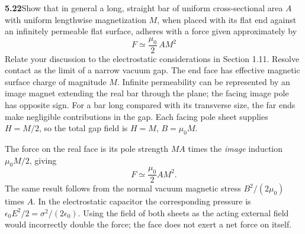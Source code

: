 \par\bigskip
\noindent\textbf{5.22}\quad Show that in general a long, straight bar of uniform cross-sectional area $A$ with uniform lengthwise magnetization $M$, when placed with its flat end against an infinitely permeable flat surface, adheres with a force given approximately by
\[
F\simeq\frac{\mu_{0}}{2}\,AM^{2}
\]
Relate your discussion to the electrostatic considerations in Section 1.11.
\solution
Resolve contact as the limit of a narrow vacuum gap. The end face has
effective magnetic surface charge of magnitude $M$.
Infinite permeability can be represented by an image magnet extending
the real bar through the plane; the facing image pole has opposite sign.
For a bar long compared with its transverse size, the far ends make
negligible contributions in the gap. Each facing pole sheet supplies
$H=M/2$, so the total gap field is $H=M$, $B=\mu_0M$.

The force on the real face is its pole strength $MA$ times the
\emph{image} induction $\mu_0M/2$, giving
\[
\boxed{F\simeq\frac{\mu_0}{2}AM^2.}
\]
The same result follows from the normal vacuum magnetic stress
$B^2/(2\mu_0)$ times $A$. In the electrostatic capacitor the corresponding
pressure is $\epsilon_0E^2/2=\sigma^2/(2\epsilon_0)$.
Using the field of both sheets as the acting external field would
incorrectly double the force; the face does not exert a net force on itself.


